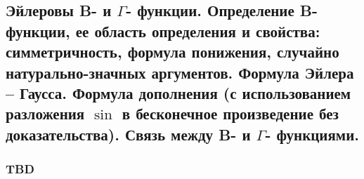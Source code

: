 \subsection{Эйлеровы B- и $\Gamma$- функции. Определение B-функции, ее область определения и свойства: симметричность, формула понижения, случайно натурально-значных аргументов. Формула Эйлера -- Гаусса. Формула дополнения (с использованием разложения $\sin$ в бесконечное произведение без доказательства). Связь между B- и $\Gamma$- функциями.}

\subsubsection{TBD}